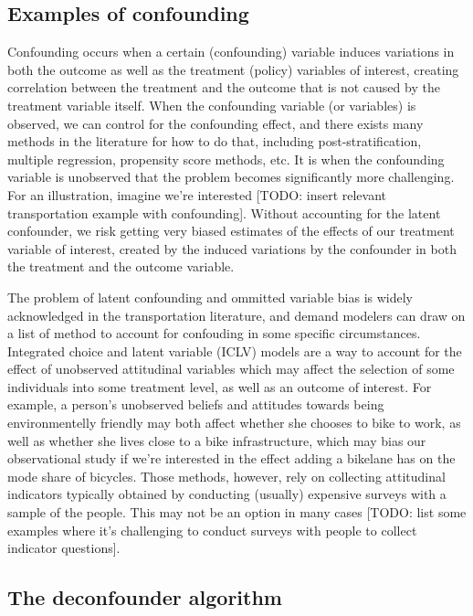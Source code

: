 \subsection{Examples of confounding}
\label{sec:confounding-examples}

Confounding occurs when a certain (confounding) variable induces variations in
both the outcome as well as the treatment (policy) variables of interest, 
creating correlation between the treatment and the outcome that is not caused
by the treatment variable itself. When the confounding variable (or variables) is 
observed, we can control for the confounding effect, and there exists many 
methods in the literature for how to do that, including post-stratification,
multiple regression, propensity score methods, etc. It is when the 
confounding variable is unobserved that the problem becomes significantly 
more challenging. For an illustration, imagine we're interested [TODO: 
insert relevant transportation example with confounding]. Without 
accounting for the latent confounder, we risk getting very biased estimates 
of the effects of our treatment variable of interest, created by the 
induced variations by the confounder in both the treatment and the outcome 
variable. 



The problem of latent confounding and ommitted variable bias is widely 
acknowledged in the transportation literature, and demand modelers can draw on 
a list of method to account for confouding in some specific circumstances. 
Integrated choice and latent variable (ICLV) models are a way to account for 
the effect of unobserved attitudinal variables which may affect the selection 
of some individuals into some treatment level, as well as an outcome of 
interest. For example, a person's unobserved beliefs and attitudes towards 
being environmentelly friendly may both affect whether she chooses to bike to 
work, as well as whether she lives close to a bike infrastructure, which may 
bias our observational study if we're interested in the effect adding a 
bikelane has on the mode share of bicycles. Those methods, however, rely on 
collecting attitudinal indicators typically obtained by conducting (usually) 
expensive surveys with a sample of the people. This may not be an option in 
many cases [TODO: list some examples where it's challenging to conduct surveys 
with people to collect indicator questions]. 


\subsection{The deconfounder algorithm}
\label{sec:deconfounder-algo}



